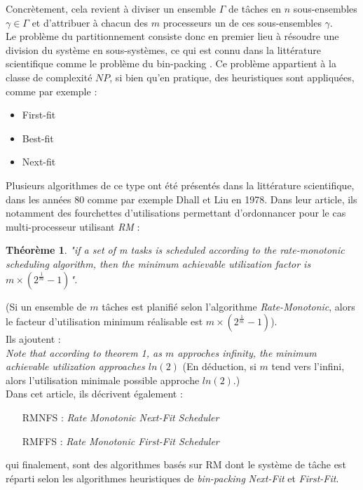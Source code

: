 \documentclass[11pt,a4paper,oneside]{report}
\newtheorem{mytheorem}{Théorème}
\begin{document}
Concrètement, cela revient à diviser un ensemble $\Gamma$ de tâches en $n$ sous-ensembles 
$\gamma \in \Gamma$ et d'attribuer à chacun des $m$ processeurs un de ces sous-ensembles $\gamma$.\\

Le problème du partitionnement consiste donc en premier lieu 
à résoudre une division du système en sous-systèmes, ce qui est connu dans la 
littérature scientifique comme le problème du bin-packing \cite{ausiello_approximation_1984}.
Ce problème appartient à la classe de complexité $NP$, si bien qu'en pratique, 
des heuristiques sont appliquées, comme par exemple :\\
\begin{itemize}
	\item First-fit 
	\item Best-fit
	\item Next-fit
\end{itemize}

Plusieurs algorithmes de ce type ont été présentés dans la littérature scientifique, 
dans les années 80 comme par exemple \cite{dhall_real-time_1978} Dhall et Liu en 1978. 
Dans leur article, ils notamment des fourchettes d'utilisations 
permettant d'ordonnancer pour le cas multi-processeur utilisant \textit{RM} :
\begin{mytheorem}
\textit{"if a set of m tasks is scheduled according to the rate-monotonic scheduling algorithm, then the minimum achievable utilization factor is $m\times(2^{\frac{1}{m}} - 1)$".}
\end{mytheorem}
(Si un ensemble de $m$ tâches est planifié selon l'algorithme \textit{Rate-Monotonic}, 
alors le facteur d'utilisation minimum réalisable est $m\times(2^{\frac{1}{m}} - 1)$). \\
Ils ajoutent :\\
\textit{Note that according to theorem 1, as $m$ approches infinity, 
	the minimum achievable utilization approaches $ln(2)$}
(En déduction, si $m$ tend vers l'infini, alors l'utilisation minimale possible approche $ln(2)$.) \\

Dans cet article, ils décrivent également :\\
\begin{itemize}
	\item[RMNFS] : \textit{Rate Monotonic Next-Fit Scheduler}
	\item[RMFFS] : \textit{Rate Monotonic First-Fit Scheduler}
\end{itemize}
\vspace{1em}
qui finalement, sont des algorithmes basés sur RM dont le système de tâche est 
réparti selon les algorithmes heuristiques de \textit{bin-packing} \textit{Next-Fit} et \textit{First-Fit}.
\end{document}
